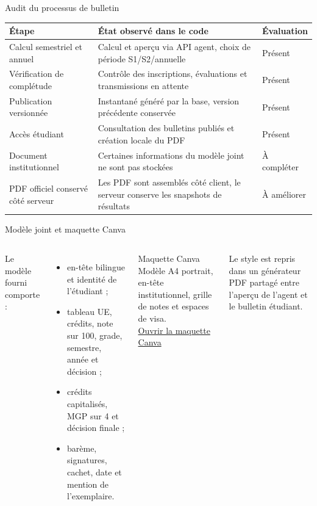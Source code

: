 \documentclass[aspectratio=169,12pt]{beamer}
\begin{document}
\begin{frame}{Audit du processus de bulletin}
  \small
  \begin{tabularx}{\textwidth}{@{}p{}X p{}@{}}
    \toprule
    Étape & État observé dans le code & Évaluation\\
    \midrule
    Calcul semestriel et annuel & Calcul et aperçu via API agent, choix de période S1/S2/annuelle & Présent\\
    Vérification de complétude & Contrôle des inscriptions, évaluations et transmissions en attente & Présent\\
    Publication versionnée & Instantané généré par la base, version précédente conservée & Présent\\
    Accès étudiant & Consultation des bulletins publiés et création locale du PDF & Présent\\
    Document institutionnel & Certaines informations du modèle joint ne sont pas stockées & À compléter\\
    PDF officiel conservé côté serveur & Les PDF sont assemblés côté client, le serveur conserve les snapshots de résultats & À améliorer\\
  \end{tabularx}
\end{frame}

\begin{frame}{Modèle joint et maquette Canva}
  \begin{columns}[T,onlytextwidth]
      Le modèle fourni comporte :
      \begin{itemize}
        \item en-tête bilingue et identité de l’étudiant ;
        \item tableau UE, crédits, note sur 100, grade, semestre, année et décision ;
        \item crédits capitalisés, MGP sur 4 et décision finale ;
        \item barème, signatures, cachet, date et mention de l’exemplaire.
      \end{itemize}
      \begin{block}{Maquette Canva}
        Modèle A4 portrait, en-tête institutionnel, grille de notes et espaces de visa.\\[.7em]
        \href{https://canva.link/x55lnt6muotlst4}{Ouvrir la maquette Canva}
      \end{block}
      \small Le style est repris dans un générateur PDF partagé entre l’aperçu de l’agent et le bulletin étudiant.
  \end{columns}
\end{frame}
\end{document}
